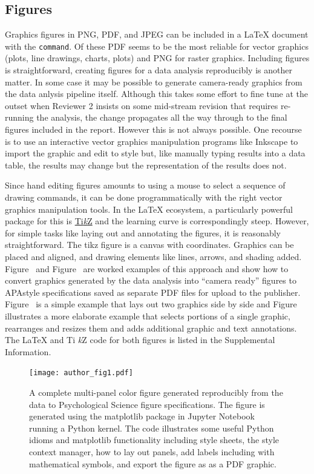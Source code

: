 \documentclass[helv,10pt,man,floatsintext]{apa6}  %
\begin{document}
\subsection{Figures}

Graphics figures in PNG, PDF, and JPEG can be included in a \LaTeX{}
document with the \texttt{command}. Of these PDF seems to
be the most reliable for vector graphics (plots, line drawings,
charts, plots) and PNG for raster graphics.  Including figures is
straightforward, creating figures for a data analysis reproducibly is
another matter. In some case it may be possible to generate
camera-ready graphics from the data anlysis pipeline itself. Although
this takes some effort to fine tune at the outset when Reviewer 2
insists on some mid-stream revision that requires re-running the
analysis, the change propagates all the way through to the final
figures included in the report. However this is not always
possible. One recourse is to use an interactive vector graphics
manipulation programs like Inkscape to import the graphic and edit to
style but, like manually typing results into a data table, the results
may change but the representation of the results does not.

Since hand editing figures amounts to using a mouse to select a
sequence of drawing commands, it can be done programmatically with the
right vector graphics manipulation tools. In the LaTeX{} ecosystem, a
particularly powerful package for this is
\href{https://en.wikipedia.org/wiki/PGF/TikZ}{Ti{\it k}Z} and the
learning curve is correspondingly steep. However, for simple tasks
like laying out and annotating the figures, it is reasonably
straightforward. The tikz figure is a canvas with coordinates.
Graphics can be placed and aligned, and drawing elements like lines,
arrows, and shading added. Figure~ and
Figure~ are worked examples of this approach and show
how to convert graphics generated by the data analysis into ``camera
ready'' figures to APAstyle specifications saved as separate PDF files
for upload to the publisher.  Figure~ is a simple
example that lays out two graphics side by side and
Figure~ illustrates a more elaborate example that
selects portions of a single graphic, rearranges and resizes them and
adds additional graphic and text annotations. The \LaTeX{} and Ti{\it
  k}Z code for both figures is listed in the Supplemental Information.

\begin{figure}[ht]
  \caption{
    A complete multi-panel color figure generated
    reproducibly from the data to Psychological Science figure
    specifications. The figure is generated using the matplotlib package in
    Jupyter Notebook running a Python kernel. The code illustrates
    some useful Python idioms and matplotlib functionality including
    style sheets, the style context manager, how to lay out panels,
    add labels including with mathematical symbols, and export the figure as
     as a PDF graphic.
  }

  \centering
  \texttt{[image: author\_fig1.pdf]}

\end{figure}
\end{document}

